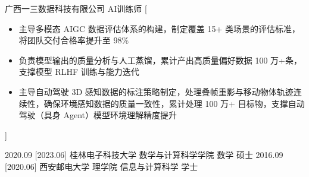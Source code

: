 \documentclass[zh]{resume}
\begin{document}
\begin{experiences}
    {广西一三数据科技有限公司 \quad AI训练师}%
    [\begin{itemize}
      \item 主导多模态 AIGC 数据评估体系的构建，制定覆盖 15+ 类场景的评估标准，将团队交付合格率提升至 98\%
      \item 负责模型输出的质量分析与人工蒸馏，累计产出高质量偏好数据 100 万+条，支撑模型 RLHF 训练与能力迭代
      \item 主导自动驾驶 3D 感知数据的标注策略制定，处理叠帧重影与移动物体轨迹连续性，确保环境感知数据的质量一致性，累计处理 100 万+ 目标物，支撑自动驾驶（具身 Agent）模型环境理解精度提升
    \end{itemize}]
\end{experiences}

\begin{educations}
  \education%
    {2020.09}%
    [2023.06]%
    {桂林电子科技大学}%
    {数学与计算科学学院}%
    {数学}%
    {硕士}
  \separator{0.2ex}
  \education%
    {2016.09}%
    [2020.06]%
    {西安邮电大学}%
    {理学院}%
    {信息与计算科学}%
    {学士}
\end{educations}
\end{document}
